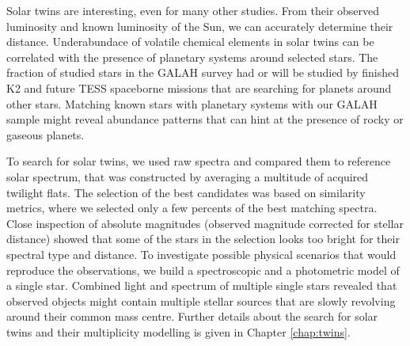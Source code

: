 Solar twins are interesting, even for many other studies. From their observed luminosity and known luminosity of the Sun, we can accurately determine their distance. Underabundace of volatile chemical elements in solar twins can be correlated with the presence of planetary systems around selected stars. The fraction of studied stars in the GALAH survey had or will be studied by finished K2 \cite{2014PASP..126..398H} and future TESS \cite{2014SPIE.9143E..20R} spaceborne missions that are searching for planets around other stars. Matching known stars with planetary systems with our GALAH sample might reveal abundance patterns that can hint at the presence of rocky or gaseous planets.

To search for solar twins, we used raw spectra and compared them to reference solar spectrum, that was constructed by averaging a multitude of acquired twilight flats. The selection of the best candidates was based on similarity metrics, where we selected only a few percents of the best matching spectra. Close inspection of absolute magnitudes (observed magnitude corrected for stellar distance) showed that some of the stars in the selection looks too bright for their spectral type and distance. To investigate possible physical scenarios that would reproduce the observations, we build a spectroscopic and a photometric model of a single star. Combined light and spectrum of multiple single stars revealed that observed objects might contain multiple stellar sources that are slowly revolving around their common mass centre. Further details about the search for solar twins and their multiplicity modelling is given in Chapter \ref{chap:twins}.
